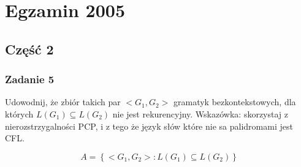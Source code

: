 \documentclass[svgnames]{report}
\begin{document}
\tableofcontents

\chapter{Egzamin 2005}
\section{Część 2}
\subsection{Zadanie 5}
\begin{framed}
Udowodnij, że zbiór takich par $<G_1, G_2>$ gramatyk bezkontekstowych, dla których $L(G_1) \subseteq L(G_2)$ nie jest rekurencyjny. Wskazówka: skorzystaj z nierozstrzygalności PCP, i z tego że język słów które nie sa palidromami jest CFL.
\end{framed}

\begin{equation*}
A = \left\{ <G_1, G_2> : L(G_1) \subseteq L(G_2) \right\}
\end{equation*}
\end{document}
